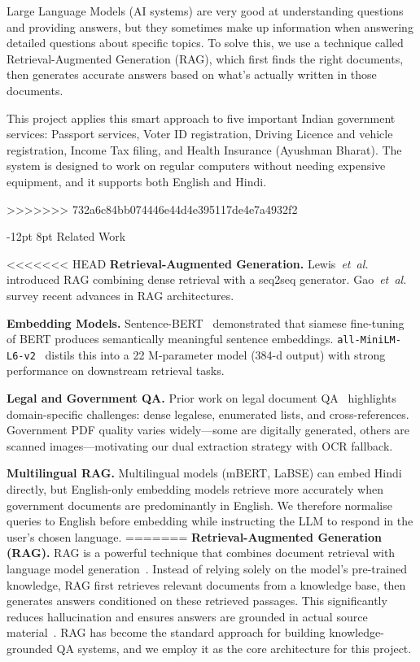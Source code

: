 \documentclass[10pt,twocolumn]{article}
\makeatletter
\renewcommand{\section}{\@startsection{section}{1}{\z@}%
  {-12pt \@plus -2pt \@minus -1pt}%
  {8pt \@plus 0.3pt}%
  {\normalfont\Large\bfseries}}
\makeatother
\begin{document}
Large Language Models (AI systems) are very good at understanding questions and providing answers, but they sometimes make up information when answering detailed questions about specific topics. To solve this, we use a technique called Retrieval-Augmented Generation (RAG), which first finds the right documents, then generates accurate answers based on what's actually written in those documents.

This project applies this smart approach to five important Indian government services: Passport services, Voter ID registration, Driving Licence and vehicle registration, Income Tax filing, and Health Insurance (Ayushman Bharat).
The system is designed to work on regular computers without needing expensive equipment, and it supports both English and Hindi.

>>>>>>> 732a6c84bb074446e44d4e395117de4e7a4932f2

\section{Related Work}

<<<<<<< HEAD
\noindent\textbf{Retrieval-Augmented Generation.}
Lewis~\textit{et~al.}~\cite{lewis2020rag} introduced RAG combining dense retrieval
with a seq2seq generator.  Gao~\textit{et~al.}~\cite{gao2023retrieval} survey
recent advances in RAG architectures.

\medskip\noindent\textbf{Embedding Models.}
Sentence-BERT~\cite{reimers2019sentence} demonstrated that siamese fine-tuning of BERT
produces semantically meaningful sentence embeddings.
\texttt{all-MiniLM-L6-v2}~\cite{wang2020minilm} distils this into a 22 M-parameter
model (384-d output) with strong performance on downstream retrieval tasks.

\medskip\noindent\textbf{Legal and Government QA.}
Prior work on legal document QA~\cite{chalkidis2020legal} highlights domain-specific
challenges: dense legalese, enumerated lists, and cross-references.
Government PDF quality varies widely---some are digitally generated, others are
scanned images---motivating our dual extraction strategy with OCR fallback.

\medskip\noindent\textbf{Multilingual RAG.}
Multilingual models (mBERT, LaBSE) can embed Hindi directly, but English-only
embedding models retrieve more accurately when government documents are predominantly
in English.  We therefore normalise queries to English before embedding while
instructing the LLM to respond in the user's chosen language.
=======
\noindent\textbf{Retrieval-Augmented Generation (RAG).}
RAG is a powerful technique that combines document retrieval with language model generation~\cite{lewis2020rag}. Instead of relying solely on the model's pre-trained knowledge, RAG first retrieves relevant documents from a knowledge base, then generates answers conditioned on these retrieved passages. This significantly reduces hallucination and ensures answers are grounded in actual source material~\cite{gao2023retrieval}. RAG has become the standard approach for building knowledge-grounded QA systems, and we employ it as the core architecture for this project.
\end{document}
